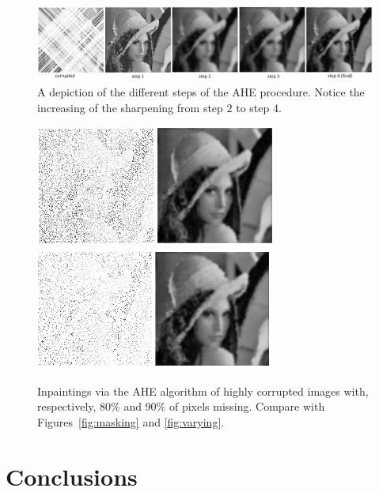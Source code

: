 \documentclass[proc]{edpsmath}
\begin{document}
\begin{figure}[t]
	\begin{center}
\includegraphics[width=\textwidth]{imgs/AHE-steps}
\caption{A depiction of the different steps of the AHE procedure. Notice the increasing of the sharpening from step $2$ to step $4$.
}
\label{fig:final-steps}
\end{center}
\end{figure}

\begin{figure}[t]
\begin{center}
  \includegraphics[height = 4.0cm]{imgs/lena-random-80-ahe}\qquad
  \includegraphics[height = 4.0cm]{imgs/lena-random-90-ahe}
\caption{Inpaintings via the AHE algorithm of highly corrupted images with, respectively, 80\% and 90\% of pixels missing. Compare with Figures~\ref{fig:masking} and \ref{fig:varying}.}
\label{fig:ahe-highly}
\end{center}
\end{figure}



\section{Conclusions}
\end{document}
